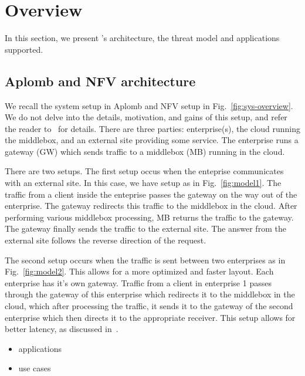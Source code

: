 


     
\section{Overview}\label{sec:overview}


In this section, we present \sys's architecture, the threat model and applications supported.

\subsection{Aplomb and NFV architecture}

We recall the system setup in Aplomb and NFV setup  in Fig.~\ref{fig:sys-overview}.
We do not delve into the details, motivation, and gains of this setup, and refer the reader to~\cite{aplomb} for details. 
There are three parties: enterprise(s), the cloud running the middlebox, and an external site providing
some service. 
The enterprise runs a gateway (GW) which sends traffic to a middlebox (MB) running in the cloud.

There are two setups. The first setup occus when the enteprise communicates with an external site.  In this case, we have setup as in Fig.~\ref{fig:model1}.
The traffic from a client inside the enteprise passes the gateway on the way out of the enterprise. The gateway redirects this traffic to the middlebox in the cloud.
After performing various middlebox processing, MB returns the traffic to the gateway. The gateway finally sends the traffic to the external site. 
The answer from the external site follows the reverse direction of the
request.


The second setup occurs when the traffic is sent between two enterprises as in Fig.~\ref{fig:model2}. This allows for a more optimized and faster layout. Each enterprise has it's own gateway.
Traffic from a client in enterprise 1 passes through the gateway of this enterprise which redirects it to the middlebox in the cloud, which after processing the traffic, it sends it to the gateway of the second enterprise which then directs it to the appropriate receiver. This setup allows for better latency, as discussed in~\cite{aplomb}.





\begin{itemize}
\item applications
\item use cases
\end{itemize}

